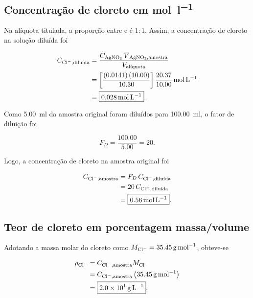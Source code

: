\documentclass[a4paper,12pt]{article}
\begin{document}
\subsection{Concentração de cloreto em \texorpdfstring{\si{\mole\per\litre}}{mol/L}}

Na alíquota titulada, a proporção entre  e  é $1:1$.
Assim, a concentração de cloreto na solução diluída foi

\begin{align}
  C_{\ce{Cl-},\text{diluída}}
  &=
  \frac{
    C_{\ce{AgNO3}}\,
    \overline{V}_{\ce{AgNO3},\text{amostra}}}
    {V_{\text{alíquota}}} \nonumber\\
  &=
  \left[
    \frac{
      \left(\num{0.0141}\right)
      \left(\num{10.00}\right)}
      {\num{10.30}}
  \right]
  \frac{\num{20.37}}{\num{10.00}}
  \,\si{\mole\per\litre} \nonumber\\
  &=\boxed{\qty{0.028}{\mole\per\litre}}.
  \label{eq:cloreto_diluida}
\end{align}

Como \qty{5.00}{\milli\litre} da amostra original foram diluídos para
\qty{100.00}{\milli\litre}, o fator de diluição foi

\begin{equation}
  F_D=\frac{100.00}{5.00}=20.
\end{equation}

Logo, a concentração de cloreto na amostra original foi

\begin{align}
  C_{\ce{Cl-},\text{amostra}}
  &=F_D\,C_{\ce{Cl-},\text{diluída}} \nonumber\\
  &=20\,C_{\ce{Cl-},\text{diluída}} \nonumber\\
  &=\boxed{\qty{0.56}{\mole\per\litre}}.
  \label{eq:cloreto_molar}
\end{align}

\subsection{Teor de cloreto em porcentagem massa/volume}

Adotando a massa molar do cloreto como
$M_{\ce{Cl-}}=\qty{35.45}{\gram\per\mole}$, obteve-se

\begin{align}
  \rho_{\ce{Cl-}}
  &=
  C_{\ce{Cl-},\text{amostra}}M_{\ce{Cl-}} \nonumber\\
  &=
  C_{\ce{Cl-},\text{amostra}}
  \left(\qty{35.45}{\gram\per\mole}\right) \nonumber\\
  &=\boxed{\qty{2.0e1}{\gram\per\litre}}.
\end{align}
\end{document}
